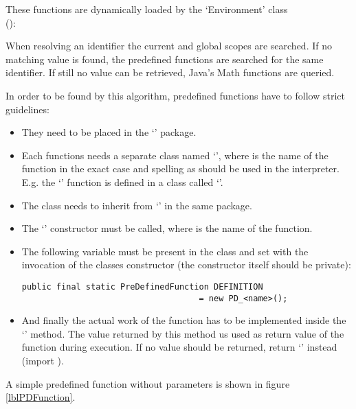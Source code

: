 These functions are dynamically loaded by the `Environment' class\\ ():

When resolving an identifier the current and global scopes are searched. If no matching value is found, the predefined functions are searched for the same identifier. If still no value can be retrieved, Java's Math functions are queried.

In order to be found by this algorithm, predefined functions have to follow strict guidelines:

\begin{itemize}
	\item They need to be placed in the `' package.
	\item Each functions needs a separate class named `', where  is the name of the function in the exact case and spelling as should be used in the interpreter.\\
		E.g. the `' function is defined in a class called `'.
	\item The class needs to inherit from `' in the same package.
	\item The `' constructor must be called, where  is the name of the function.
	\item The following variable must be present in the class and set with the invocation of the classes constructor (the constructor itself should be private):
\begin{lstlisting}[frame=none,numbers=none]
public final static PreDefinedFunction DEFINITION
                                    = new PD_<name>();
\end{lstlisting}
	\item And finally the actual work of the function has to be implemented inside the `' method. The value returned by this method us used as return value of the function during execution. If no value should be returned, return `' instead (import ).

\end{itemize}

A simple predefined function without parameters is shown in figure \ref{lblPDFunction}.


